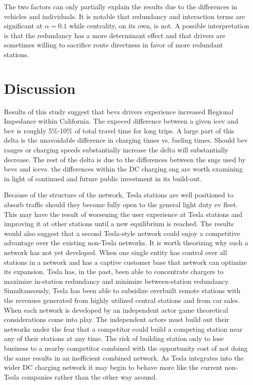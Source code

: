 \begin{multicols}{2}
The two factors can only partially explain the results due to the differences in vehicles and individuals. It is notable that redundancy and interaction terms are significant at $\alpha=0.1$ while centrality, on its own, is not. A possible interpretation is that the redundancy has a more determinant effect and that drivers are sometimes willing to sacrifice route directness in favor of more redundant stations.

\section*{Discussion}

Results of this study suggest that \glspl{bev} drivers experience increased Regional Impedance within California. The expeced difference between a given \gls{icev} and \gls{bev} is roughly 5\%-10\% of total travel time for long trips. A large part of this delta is the unavoidable difference in charging times vs. fueling times. Should \gls{bev} ranges or charging speeds substantially increase the delta will substantially decrease. The rest of the delta is due to the differences between the \glspl{sng} used by \glspl{bev} and \glspl{icev}. the differences within the DC charging \gls{sng} are worth examining in light of continued and future public investment in its build-out.

Because of the structure of the network, Tesla stations are well positioned to absorb traffic should they become fully open to the general light duty \gls{ev} fleet. This may have the result of worsening the user experience at Tesla stations and improving it at other stations until a new equilibrium is reached. The results would also suggest that a second Tesla-style network could enjoy a competitive advantage over the existing non-Tesla networks. It is worth theorizing why such a network has not yet developed. When one single entity has control over all stations in a network and has a captive customer base that network can optimize its expansion. Tesla has, in the past, been able to concentrate chargers to maximize in-station redundancy and minimize between-station redundancy. Simultaneously, Tesla has been able to subsidize overbuilt remote stations with the revenues generated from highly utilized central stations and from car sales. When each network is developed by an independent actor game theoretical considerations come into play. The independent actors must build out their networks under the fear that a competitor could build a competing station near any of their stations at any time. The risk of building station only to lose business to a nearby competitor combined with the opportunity cost of not doing the same results in an inefficient combined network. As Tesla integrates into the wider DC charging network it may begin to behave more like the current non-Tesla companies rather than the other way around. 


\end{multicols}
